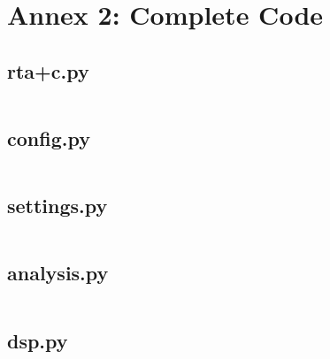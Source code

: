 \chapter{Annex 2: Complete Code}

\section{rta+c.py}

\inputminted[label={rta+c.py}]{python3}{src/rta+c.py}

\newpage
\section{config.py}

\inputminted[label={config.py}]{python3}{src/config.py}

\newpage
\section{settings.py}

\inputminted[label={settings.py}]{python3}{src/settings.py}

\newpage
\section{analysis.py}

\inputminted[label={analysis.py}]{python3}{src/analysis.py}

\newpage
\section{dsp.py}

\inputminted[label={dsp.py}]{python3}{src/dsp.py}